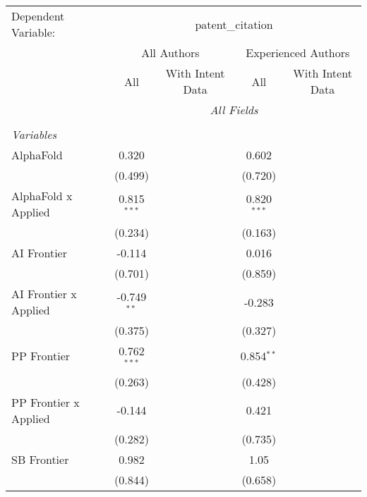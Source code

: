 \begingroup
\centering
\begin{tabular}{lcccccc}
   \tabularnewline \midrule \midrule
   Dependent Variable: & \multicolumn{6}{c}{patent\_citation}\\
 & \multicolumn{3}{c}{All Authors} & \multicolumn{3}{c}{Experienced Authors} \\
\cmidrule(lr){2-4} \cmidrule(lr){5-7}
 & \multicolumn{1}{c}{All} & \multicolumn{2}{c}{With Intent Data} & \multicolumn{1}{c}{All} & \multicolumn{2}{c}{With Intent Data} \\
\cmidrule(lr){2-2} \cmidrule(lr){3-4} \cmidrule(lr){5-5} \cmidrule(lr){6-7}
 & \multicolumn{6}{c}{\textit{All Fields}} \\ \\
   \emph{Variables}\\
   AlphaFold             & 0.320         &        &        & 0.602         &        &   \\   
                         & (0.499)       &        &        & (0.720)       &        &   \\   
   AlphaFold x Applied   & 0.815$^{***}$ &        &        & 0.820$^{***}$ &        &   \\   
                         & (0.234)       &        &        & (0.163)       &        &   \\   
   AI Frontier           & -0.114        &        &        & 0.016         &        &   \\   
                         & (0.701)       &        &        & (0.859)       &        &   \\   
   AI Frontier x Applied & -0.749$^{**}$ &        &        & -0.283        &        &   \\   
                         & (0.375)       &        &        & (0.327)       &        &   \\   
   PP Frontier           & 0.762$^{***}$ &        &        & 0.854$^{**}$  &        &   \\   
                         & (0.263)       &        &        & (0.428)       &        &   \\   
   PP Frontier x Applied & -0.144        &        &        & 0.421         &        &   \\   
                         & (0.282)       &        &        & (0.735)       &        &   \\   
   SB Frontier           & 0.982         &        &        & 1.05          &        &   \\   
                         & (0.844)       &        &        & (0.658)       &        &   \\   

\end{tabular}
